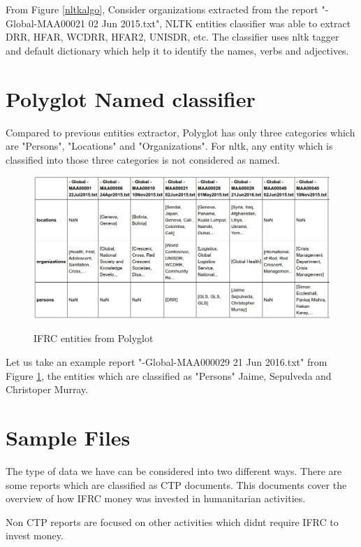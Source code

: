 From Figure \ref{nltkalgo}, Consider organizations extracted from the report "-Global-MAA00021 02 Jun 2015.txt", NLTK entities classifier was able to extract DRR, HFAR, WCDRR, HFAR2, UNISDR, etc. The classifier uses nltk tagger and default dictionary which help it to identify the names, verbs and adjectives.

\section{Polyglot Named classifier}

Compared to previous entities extractor, Polyglot has only three categories which are "Persons", "Locations" and "Organizations". For nltk, any entity which is classified into those three categories is not considered as named.
\newpage

\begin{figure}[hbtp]
\caption{IFRC entities from Polyglot}
\centering
\includegraphics[scale=.45]{images/polyglot.png}\label{polyglot}
\end{figure}
Let us take an example report "-Global-MAA000029 21 Jun 2016.txt" from Figure \ref{polyglot}, the entities which are classified as "Persons" Jaime, Sepulveda and  Christoper Murray.




\section{Sample Files} 
The type of data we have can be considered into two different ways. There are some reports which are classified as CTP documents. This documents cover the overview of how IFRC money was invested in humanitarian activities.

Non CTP reports are focused on other activities which didnt require IFRC to invest money. 

